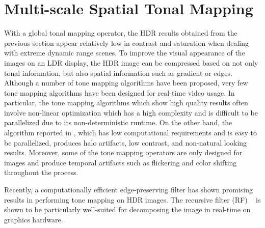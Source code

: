 \section{Multi-scale Spatial Tonal Mapping}
With a global tonal mapping operator, the HDR results obtained from the previous section appear 
relatively low in contrast and saturation when dealing with extreme dynamic range scenes. To 
improve the visual appearance of the images on an LDR display, the HDR image can be compressed 
based on not only tonal information, but also spatial information such as gradient or edges. Although 
a number of tone mapping algorithms have been proposed, very few tone mapping algorithms have 
been designed for real-time video usage. In particular, the tone mapping algorithms which show high 
quality results often involve non-linear optimization which has a high complexity and is difficult to be 
parallelized due to its non-deterministic runtime. On the other hand, the algorithm reported in 
\cite{reinhard2002photographic}, which has low computational requirements and is easy to be 
parallelized, produces halo artifacts, low contrast, and non-natural looking results. Moreover, some of 
the tone mapping operators are only designed for images and produce temporal artifacts such as 
flickering and color shifting throughout the process.

Recently, a computationally efficient edge-preserving filter \cite{chen2007real, 
GastalOliveira2011DomainTransform} has shown promising results in performing tone mapping on 
HDR images. The recursive filter (RF) ~\cite{GastalOliveira2011DomainTransform} is shown to be 
particularly well-suited for decomposing the image in real-time on graphics hardware.

